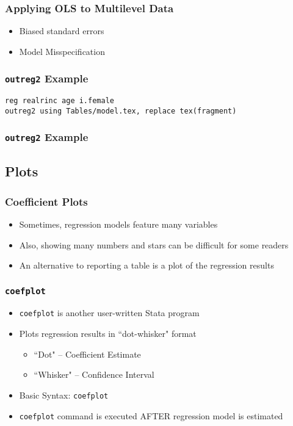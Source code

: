 \documentclass{beamer}
\begin{document}
\begin{frame}
	\frametitle{Applying OLS to Multilevel Data}
		\begin{itemize}
			\item Biased standard errors
			\item Model Misspecification
		\end{itemize}
\end{frame}

\begin{frame}
	\frametitle{\texttt{outreg2} Example}
		\texttt{reg realrinc age i.female}\\
		\texttt{outreg2 using Tables/model.tex, replace tex(fragment)}
\end{frame}

\begin{frame}
	\frametitle{\texttt{outreg2} Example}
\end{frame}

\subsection{Plots}

\begin{frame}
	\frametitle{Coefficient Plots}
		\begin{itemize}
			\item Sometimes, regression models feature many variables
			\item Also, showing many numbers and stars can be difficult for some readers
			\item An alternative to reporting a table is a plot of the regression results
		\end{itemize}
\end{frame}

\begin{frame}
	\frametitle{\texttt{coefplot}}
		\begin{itemize}
			\item \texttt{coefplot} is another user-written Stata program
			\item Plots regression results in ``dot-whisker" format
				\begin{itemize}
					\item ``Dot" -- Coefficient Estimate
					\item ``Whisker" -- Confidence Interval
				\end{itemize}
			\item Basic Syntax: \texttt{coefplot}
			\item \texttt{coefplot} command is executed AFTER regression model is estimated
		\end{itemize}
\end{frame}
\end{document}
